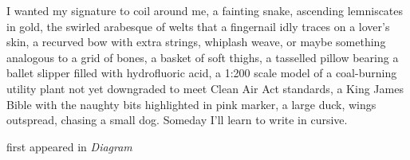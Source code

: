 I wanted my signature to coil around me, a fainting snake, ascending
lemniscates in gold, the swirled arabesque of welts that a fingernail
idly traces on a lover's skin, a recurved bow with extra strings,
whiplash weave, or maybe something analogous to a grid of bones, a
basket of soft thighs, a tasselled pillow bearing a ballet slipper
filled with hydrofluoric acid, a 1:200 scale model of a coal-burning
utility plant not yet downgraded to meet Clean Air Act standards, a King
James Bible with the naughty bits highlighted in pink marker, a large
duck, wings outspread, chasing a small dog. Someday I'll learn to write
in cursive.

first appeared in \emph{Diagram}
